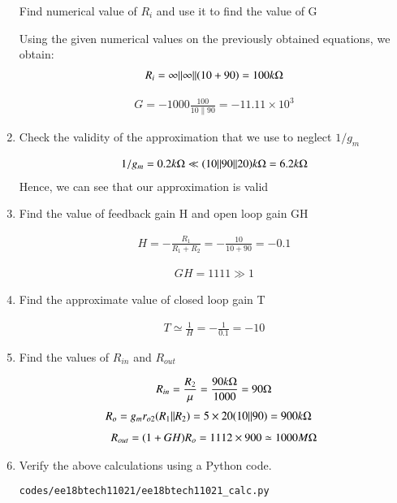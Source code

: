 \begin{enumerate}[label=\thesubsection.\arabic*.,ref=\thesubsection.\theenumi]
Find numerical value of $R_{i}$ and use it to find the value of G

\solution
Using the given numerical values on the previously obtained equations, we obtain:
\begin{align}
    R_{i}=\infty\|\infty\|(10+90)=100 k\ohm
\end{align}

\begin{align}
    G =-1000 \frac{100}{10 \| 90}=-11.11 \times 10^{3}
\end{align}

\item 
Check the validity of the approximation that we use to neglect $1/g_{m}$

\solution
\begin{align}
    1 / g_{m}=0.2 k\ohm \ll (10\|90\| 20)k\ohm = 6.2k\ohm
\end{align}
Hence, we can see that our approximation is valid

\item
Find the value of feedback gain H and open loop gain GH

\solution
\begin{align}
    H=-\frac{R_{1}}{R_{1}+R_{2}}=-\frac{10}{10+90}=-0.1
\end{align}

\begin{align}
    GH=1111 \gg 1
\end{align}

\item
Find the approximate value of closed loop gain T

\solution
\begin{align}
    T \simeq \frac{1}{H} = -\frac{1}{0.1} = -10
\end{align}

\item
Find the values of $R_{in}$ and $R_{out}$

\solution
\begin{align}
    R_{in}=\frac{R_{2}}{\mu}=\frac{90k\ohm}{1000}=90\ohm
\end{align}
\begin{align}
    R_{o} &=g_{m} r_{o 2}(R_{1} \| R_{2}) =5 \times 20(10 \| 90)=900k\ohm
\end{align}
\begin{align}
    R_{out}=(1+GH) R_{o}=1112 \times 900 \simeq 1000M\ohm
\end{align}

\begin{table}[!ht]
\centering

\caption{}
\label{table: Output_Table}
\end{table}

\item
Verify the above calculations using a Python code.

\solution
\begin{lstlisting}
codes/ee18btech11021/ee18btech11021_calc.py
\end{lstlisting}

\end{enumerate}
